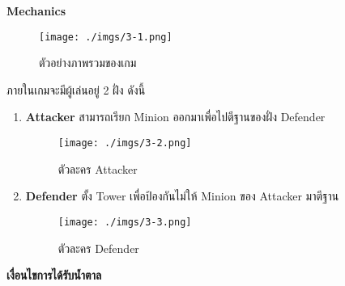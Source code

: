 \documentclass[12pt,oneside,openright,a4paper]{cpe-thai-project}
\begin{document}
\textbf{Mechanics} 

\begin{figure}[H]\centering
  \texttt{[image: ./imgs/3-1.png]}
  \caption{ตัวอย่างภาพรวมของเกม}\label{fig:3-1}
\end{figure}

ภายในเกมจะมีผู้เล่นอยู่ 2 ฝั่ง ดังนี้
\begin{enumerate}
  \item \textbf{Attacker} สามารถเรียก Minion ออกมาเพื่อไปตีฐานของฝั่ง Defender
  \begin{figure}[H]\centering
    \texttt{[image: ./imgs/3-2.png]}
    \caption{ตัวละคร Attacker}\label{fig:3-2}
  \end{figure}

  \pagebreak
  \item \textbf{Defender} ตั้ง Tower เพื่อป้องกันไม่ให้ Minion ของ Attacker มาตีฐาน
  \begin{figure}[H]\centering
    \texttt{[image: ./imgs/3-3.png]}
    \caption{ตัวละคร Defender}\label{fig:3-3}
  \end{figure}
\end{enumerate}

\textbf{เงื่อนไขการได้รับน้ำตาล}
\end{document}
